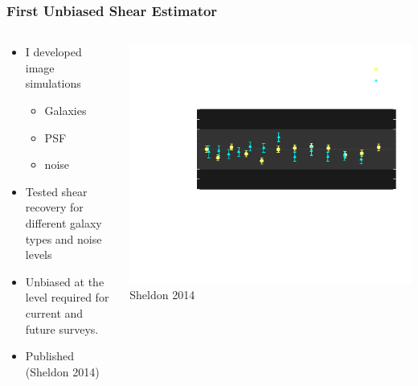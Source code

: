 \documentclass{beamer}
\begin{document}
\frame
{
    \frametitle{First Unbiased Shear Estimator}

    \begin{columns}
        \begin{column}{0.5\textwidth}    
            \begin{itemize}

                \item I developed image simulations
                    \begin{itemize}
                        \item Galaxies
                        \item PSF
                        \item noise
                    \end{itemize}

                \item Tested shear recovery for different galaxy types
                    and noise levels

                \item Unbiased at the level required for current and future surveys.

                \item {\color{gold} Published (Sheldon 2014)}

            \end{itemize}
        \end{column}
        \begin{column}{0.5\textwidth}    
            \begin{center}
            \includegraphics[width=\textwidth]{ngmix-flux-s2n-sigrat-20-invert.pdf}
                \newline
                Sheldon 2014
            \end{center}
        \end{column}
    \end{columns}
}
\end{document}
